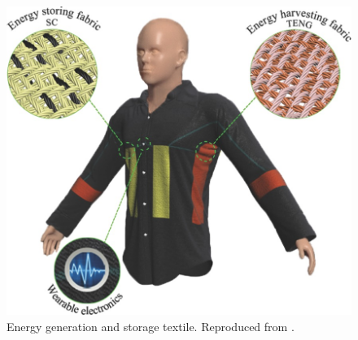 \begin{figure}[!htb]
\centering
\includegraphics[scale = 6]{images/EnergyFabric.jpg}
\caption{Energy generation and storage textile. Reproduced from \cite{Pu2016}.}
\label{fig:EnergyFabric}
\end{figure}


